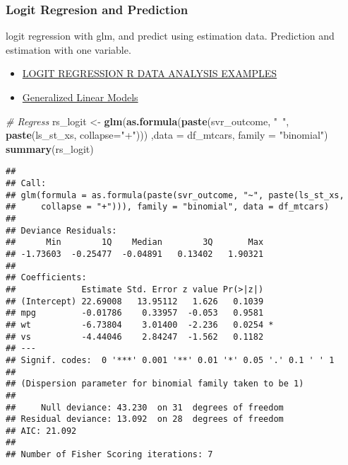 \documentclass[
]{book}
\newenvironment{Shaded}{\begin{snugshade}}{\end{snugshade}}
\newcommand{\CommentTok}[1]{\textcolor[rgb]{0.56,0.35,0.01}{\textit{#1}}}
\newcommand{\DataTypeTok}[1]{\textcolor[rgb]{0.13,0.29,0.53}{#1}}
\newcommand{\KeywordTok}[1]{\textcolor[rgb]{0.13,0.29,0.53}{\textbf{#1}}}
\newcommand{\NormalTok}[1]{#1}
\newcommand{\StringTok}[1]{\textcolor[rgb]{0.31,0.60,0.02}{#1}}
\providecommand{\tightlist}{%
  \setlength{\itemsep}{0pt}\setlength{\parskip}{0pt}}
\begin{document}
\hypertarget{logit-regresion-and-prediction}{%
\subsubsection{Logit Regresion and Prediction}\label{logit-regresion-and-prediction}}

logit regression with glm, and predict using estimation data. Prediction and estimation with one variable.

\begin{itemize}
\tightlist
\item
  \href{https://stats.idre.ucla.edu/r/dae/logit-regression/}{LOGIT REGRESSION R DATA ANALYSIS EXAMPLES}
\item
  \href{https://www.statmethods.net/advstats/glm.html}{Generalized Linear Models}
\end{itemize}

\begin{Shaded}
\begin{Highlighting}[]
\CommentTok{# Regress}
\NormalTok{rs_logit <-}\StringTok{ }\KeywordTok{glm}\NormalTok{(}\KeywordTok{as.formula}\NormalTok{(}\KeywordTok{paste}\NormalTok{(svr_outcome, }\StringTok{"~"}\NormalTok{, }\KeywordTok{paste}\NormalTok{(ls_st_xs, }\DataTypeTok{collapse=}\StringTok{"+"}\NormalTok{)))}
\NormalTok{                ,}\DataTypeTok{data =}\NormalTok{ df_mtcars, }\DataTypeTok{family =} \StringTok{"binomial"}\NormalTok{)}
\KeywordTok{summary}\NormalTok{(rs_logit)}
\end{Highlighting}
\end{Shaded}

\begin{verbatim}
## 
## Call:
## glm(formula = as.formula(paste(svr_outcome, "~", paste(ls_st_xs, 
##     collapse = "+"))), family = "binomial", data = df_mtcars)
## 
## Deviance Residuals: 
##      Min        1Q    Median        3Q       Max  
## -1.73603  -0.25477  -0.04891   0.13402   1.90321  
## 
## Coefficients:
##             Estimate Std. Error z value Pr(>|z|)  
## (Intercept) 22.69008   13.95112   1.626   0.1039  
## mpg         -0.01786    0.33957  -0.053   0.9581  
## wt          -6.73804    3.01400  -2.236   0.0254 *
## vs          -4.44046    2.84247  -1.562   0.1182  
## ---
## Signif. codes:  0 '***' 0.001 '**' 0.01 '*' 0.05 '.' 0.1 ' ' 1
## 
## (Dispersion parameter for binomial family taken to be 1)
## 
##     Null deviance: 43.230  on 31  degrees of freedom
## Residual deviance: 13.092  on 28  degrees of freedom
## AIC: 21.092
## 
## Number of Fisher Scoring iterations: 7
\end{verbatim}
\end{document}
